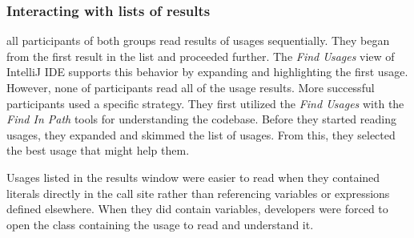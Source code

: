 \documentclass[conference]{IEEEtran}
\begin{document}


\subsubsection{Interacting with lists of results} all participants of both groups read results of usages sequentially. They began from the first result in the list and proceeded further.
The \textit{Find Usages} view of IntelliJ IDE supports this behavior by expanding and highlighting the first usage. 
However, none of participants read all of the usage results. 
More successful participants used a specific strategy.  They first utilized the \textit{Find Usages} with the \textit{Find In Path} tools for understanding the codebase. Before they started reading usages, they expanded and skimmed the list of usages. From this, they selected the best usage that might help them. \par


Usages listed in the results window were easier to read when they contained literals directly in the call site rather than referencing variables or expressions defined elsewhere. When they did contain variables, developers were forced to open the class containing the usage to read and understand it. \par
\end{document}
